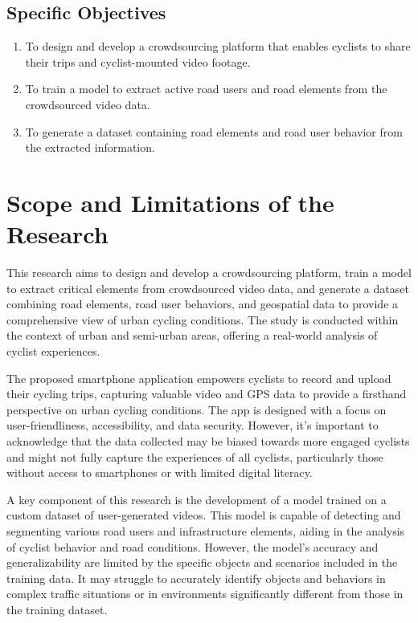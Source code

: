 \subsection{Specific Objectives}
\label{sec:specificobjectives}

\begin{enumerate}
    \item To design and develop a crowdsourcing platform that enables cyclists to share their trips and cyclist-mounted video footage. 
    \item To train a model to extract active road users and road elements from the crowdsourced video data. 
    \item To generate a dataset containing road elements and road user behavior from the extracted information.
\end{enumerate}

\section{Scope and Limitations of the Research}
\label{sec:scopelimitations}

This research aims to design and develop a crowdsourcing platform, train a model to extract critical elements from crowdsourced video data, and generate a dataset combining road elements, road user behaviors, and geospatial data to provide a comprehensive view of urban cycling conditions. The study is conducted within the context of urban and semi-urban areas, offering a real-world analysis of cyclist experiences.

The proposed smartphone application empowers cyclists to record and upload their cycling trips, capturing valuable video and GPS data to provide a firsthand perspective on urban cycling conditions. The app is designed with a focus on user-friendliness, accessibility, and data security. However, it's important to acknowledge that the data collected may be biased towards more engaged cyclists and might not fully capture the experiences of all cyclists, particularly those without access to smartphones or with limited digital literacy.

A key component of this research is the development of a model trained on a custom dataset of user-generated videos. This model is capable of detecting and segmenting various road users and infrastructure elements, aiding in the analysis of cyclist behavior and road conditions. However, the model's accuracy and generalizability are limited by the specific objects and scenarios included in the training data. It may struggle to accurately identify objects and behaviors in complex traffic situations or in environments significantly different from those in the training dataset.

